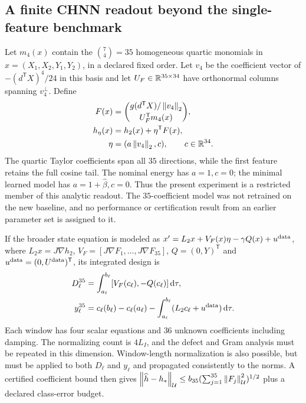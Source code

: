 \subsection{A finite CHNN readout beyond the single-feature benchmark}
\label{ss:full-features}

Let $m_4(x)$ contain the $\binom{7}{4}=35$ homogeneous quartic monomials in $x=(X_1,X_2,Y_1,Y_2)$, in a declared fixed order. Let $v_4$ be the coefficient vector of $-(d^{\mathsf T}X)^4/24$ in this basis and let $U_F\in\mathbb R^{35\times34}$ have orthonormal columns spanning $v_4^\perp$. Define
\begin{equation}\label{ss:full-readout}
\begin{aligned}
 F(x)&=\binom{g(d^{\mathsf T}X)/\left\lVert v_4\right\rVert_2}{U_F^{\mathsf T}m_4(x)},\\
 h_\eta(x)&=h_2(x)+\eta^{\mathsf T}F(x),\\
 \eta&=(a\left\lVert v_4\right\rVert_2,c),\qquad c\in\mathbb R^{34}.
\end{aligned}
\end{equation}
The quartic Taylor coefficients span all $35$ directions, while the first feature retains the full cosine tail. The nominal energy has $a=1,c=0$; the minimal learned model has $a=1+\widehat\beta,c=0$. Thus the present experiment is a restricted member of this analytic readout. The $35$-coefficient model was not retrained on the new baseline, and no performance or certification result from an earlier parameter set is assigned to it.

If the broader state equation is modeled as
$x'=L_2x+V_F(x)\eta-\gamma Q(x)+u^{\rm data}$,
where $L_2x=J\nabla h_2$,
$V_F=[J\nabla F_1,\ldots,J\nabla F_{35}]$,
$Q=(0,Y)^{\mathsf T}$ and $u^{\rm data}=(0,U^{\rm data})^{\mathsf T}$, its integrated design is
\begin{equation}\label{ss:full-design}
\begin{aligned}
 D_\ell^{35}&=\int_{a_\ell}^{b_\ell}[V_F(c_\ell),-Q(c_\ell)]\,\mathrm d\tau,\\
 y_\ell^{35}&=c_\ell(b_\ell)-c_\ell(a_\ell)
       -\int_{a_\ell}^{b_\ell}(L_2c_\ell+u^{\rm data})\,\mathrm d\tau.
\end{aligned}
\end{equation}
Each window has four scalar equations and $36$ unknown coefficients including damping. The normalizing count is $4L_I$, and the defect and Gram analysis must be repeated in this dimension. Window-length normalization is also possible, but must be applied to both $D_\ell$ and $y_\ell$ and propagated consistently to the norms. A certified coefficient bound then gives
$\left\lVert\widehat h-h_*\right\rVert_{\mathcal U}\le b_{35}(\sum_{j=1}^{35}\left\lVert F_j\right\rVert_{\mathcal U}^2)^{1/2}$
plus a declared class-error budget.

